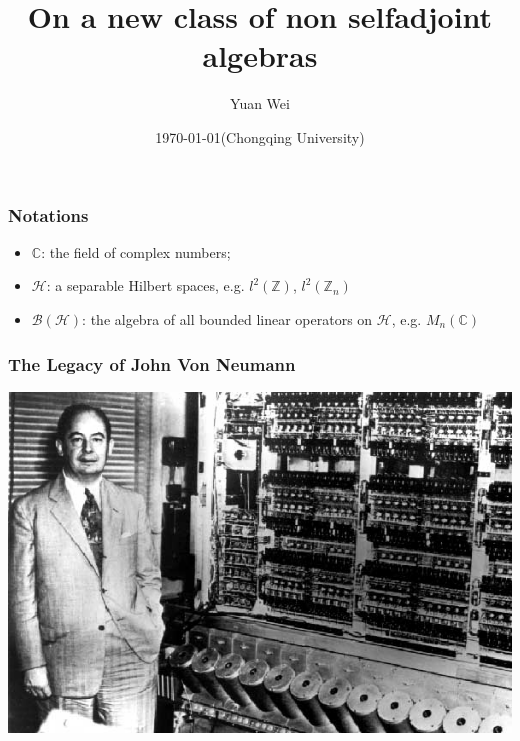 \documentclass{beamer}
\title{On a new class of non selfadjoint algebras }
\author{Yuan Wei \inst{AMSS}}
\institute[Academy of Mathematics and Systems Science, Chinese Academy of
Sciences] { \inst{1}%
Institute of Mathematics}
\date{\today (Chongqing University)}
\newcommand{\B}{\mathcal B}
\newcommand{\HHH}{\mathcal H} %
\newcommand{\C}{\mathbb C }
\newcommand{\Z}{\mathbb Z}
\begin{document}
\begin{frame}
\titlepage
\end{frame}


\begin{frame}
\frametitle{Notations}

\begin{itemize}
  \item $\C$: the field of complex numbers;\vspace{.3cm}
  \pause
  \item $\HHH$: a separable Hilbert spaces, e.g. $l^2(\Z)$,
  $l^2(\Z_{n})$\vspace{.3cm}
  \pause
  \item $\B(\HHH)$: the algebra of all bounded linear
        operators on $\HHH$, e.g. $M_n(\C)$
\end{itemize}
\end{frame}

\begin{frame}
\frametitle{The Legacy of John Von Neumann}
\begin{center}
\includegraphics[scale = 0.4]{VNC.jpg}
\end{center}
\end{frame}
\end{document}
